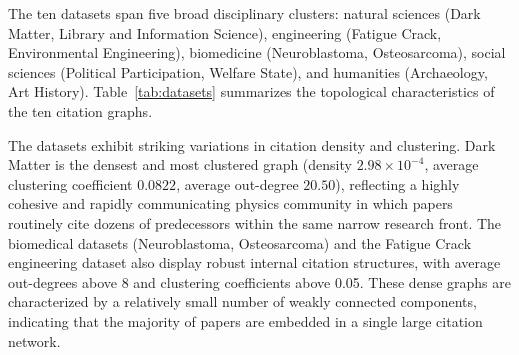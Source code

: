 \documentclass[11pt,a4paper]{article}
\begin{document}
The ten datasets span five broad disciplinary clusters: natural sciences (Dark Matter, Library and Information Science), engineering (Fatigue Crack, Environmental Engineering), biomedicine (Neuroblastoma, Osteosarcoma), social sciences (Political Participation, Welfare State), and humanities (Archaeology, Art History). Table~\ref{tab:datasets} summarizes the topological characteristics of the ten citation graphs.

\begin{table}[H]
\centering
\caption{Descriptive statistics of the ten disciplinary citation graphs extracted from Dimensions (1975--2024). Density is computed as $|E| / (|V|(|V|-1))$.}
\label{tab:datasets}
\end{table}

The datasets exhibit striking variations in citation density and clustering. Dark Matter is the densest and most clustered graph (density $2.98\times 10^{-4}$, average clustering coefficient $0.0822$, average out-degree $20.50$), reflecting a highly cohesive and rapidly communicating physics community in which papers routinely cite dozens of predecessors within the same narrow research front. The biomedical datasets (Neuroblastoma, Osteosarcoma) and the Fatigue Crack engineering dataset also display robust internal citation structures, with average out-degrees above 8 and clustering coefficients above 0.05. These dense graphs are characterized by a relatively small number of weakly connected components, indicating that the majority of papers are embedded in a single large citation network.
\end{document}

